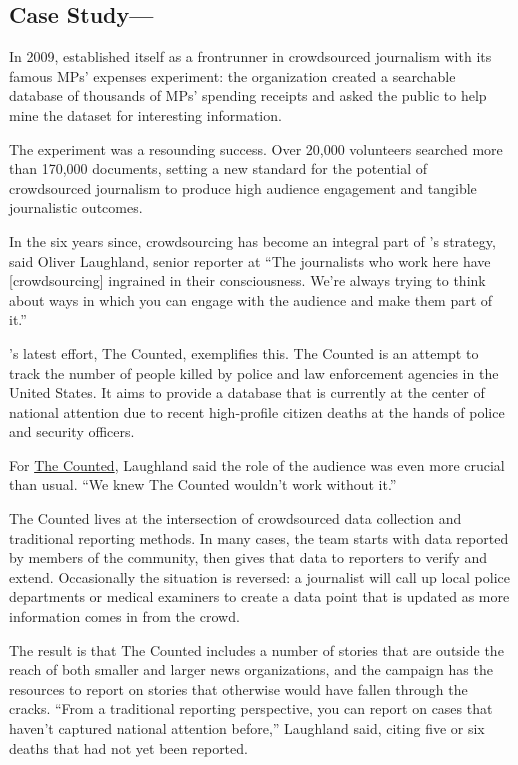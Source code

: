 \begin{itemize}
\begin{enumerate}
{\subsection{Case Study---}

In 2009,  established itself as a frontrunner in crowdsourced journalism with its famous MPs’ expenses experiment: the organization created a searchable database of thousands of MPs’ spending receipts and asked the public to help mine the dataset for interesting information.

The experiment was a resounding success. Over 20,000 volunteers searched more than 170,000 documents, setting a new standard for the potential of crowdsourced journalism to produce high audience engagement and tangible journalistic outcomes. 

In the six years since, crowdsourcing has become an integral part of ’s strategy, said Oliver Laughland, senior reporter at \autocite{Laughland} ``The journalists who work here have [crowdsourcing] ingrained in their consciousness. We’re always trying to think about ways in which you can engage with the audience and make them part of it.''

’s latest effort, The Counted, exemplifies this.\autocite{Counted} The Counted is an attempt to track the number of people killed by police and law enforcement agencies in the United States. It aims to provide a database that is currently at the center of national attention due to recent high-profile citizen deaths at the hands of police and security officers.

For \href{http://www.theguardian.com/us-news/series/counted-us-police-killings}{The Counted}, Laughland said the role of the audience was even more crucial than usual. ``We knew The Counted wouldn’t work without it.''\autocite{Laughland}

The Counted lives at the intersection of crowdsourced data collection and traditional reporting methods. In many cases, the team starts with data reported by members of the community, then gives that data to reporters to verify and extend. Occasionally the situation is reversed: a journalist will call up local police departments or medical examiners to create a data point that is updated as more information comes in from the crowd. 

The result is that The Counted includes a number of stories that are outside the reach of both smaller and larger news organizations, and the campaign has the resources to report on stories that otherwise would have fallen through the cracks. ``From a traditional reporting perspective, you can report on cases that haven’t captured national attention before,'' Laughland said, citing five or six deaths that had not yet been reported. 

}
\end{enumerate}
\end{itemize}
